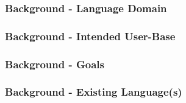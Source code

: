 
\begin{frame} \frametitle{Background - Language Domain}
\end{frame}

\begin{frame} \frametitle{Background - Intended User-Base}
\end{frame}

\begin{frame} \frametitle{Background - Goals}
\end{frame}

\begin{frame} \frametitle{Background - Existing Language(s)}
\end{frame}

